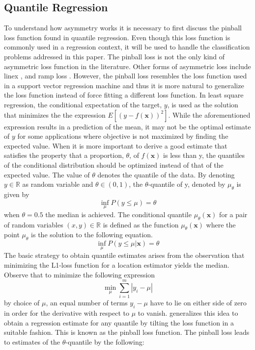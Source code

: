 \documentclass[twoside,11pt]{article}
\begin{document}
\subsection{Quantile Regression}
To understand how asymmetry works it is necessary to first discuss the pinball loss function found in quantile regression. Even though this loss function is commonly used in a regression context, it will be used to handle the classification problems addressed in this paper. The pinball loss is not the only kind of asymmetric loss function in the literature. Other forms of asymmetric loss include linex \citep{Demetrescu07} \citep{Ohtani95}, and ramp loss \citep{Takeuchi06}. However, the pinball loss resembles the loss function used in a support vector regression machine and thus it is more natural to generalize the loss function instead of force fitting a different loss function. In least square regression, the conditional expectation of the target, $y$, is used as the solution that minimizes the the expression $E[(y-f(\mathbf{x}))^2]$. While the aforementioned expression results in a prediction of the mean, it may not be the optimal estimate of $y$ for some applications where objective is not maximized by finding the expected value. When it is more important to derive a good estimate that satisfies the property that a proportion, $\theta$, of $f(\mathbf{x})$ is less than y, the quantiles of the conditional distribution should be optimized instead of that of the expected value. The value of $\theta$ denotes the quantile of the data. By denoting $y \in \mathbb{R}$ as random variable and $\theta \in (0,1)$, the $\theta$-quantile of y, denoted by $\mu_{\theta}$ is given by
 \begin{equation}
 \inf_{\mu}P(y\leq \mu)=\theta
 \end{equation}
when $\theta = 0.5$ the median is achieved. The conditional quantile $\mu_{\theta}(\mathbf{x})$ for a pair of random variables $(x,y) \in \mathbb{R}$ is defined as the function $\mu_{\theta}(\mathbf{x}) $ where the point $\mu_{\theta}$ is the solution to the following equation.
 \begin{equation}
 \inf_{\mu}P(y\leq \mu|\mathbf{x})=\theta
 \end{equation}
The basic strategy to obtain quantile estimates arises from the observation that minimizing the L1-loss function for a location estimator yields the median. Observe that to minimize the following expression
\begin{equation}
\min_{\mu}\sum_{i=1}^{m}|y_i-\mu|
 \end{equation}
by choice of $\mu$, an equal number of terms $y_i-\mu$ have to lie on either side of zero in order for the derivative with respect to $\mu$ to vanish. \citet{Koenker01} generalizes this idea to obtain a regression estimate for any quantile by tilting the loss function in a suitable fashion. This is known as the pinball loss function. The pinball loss leads to estimates of the $\theta$-quantile by the following:
\end{document}

